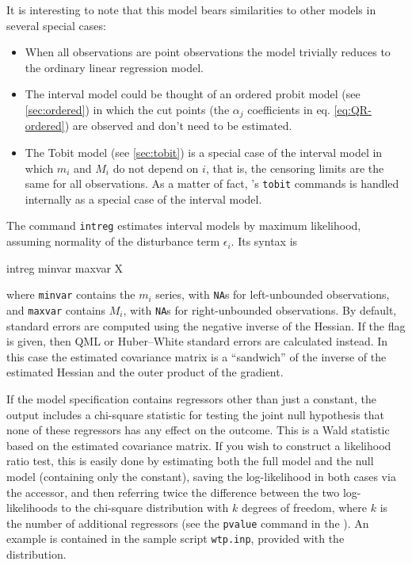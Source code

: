 It is interesting to note that this model bears similarities to other
models in several special cases:
\begin{itemize}
\item When all observations are point observations the model trivially
  reduces to the ordinary linear regression model.
\item The interval model could be thought of an ordered probit model
  (see \ref{sec:ordered}) in which the cut points (the $\alpha_j$
  coefficients in eq. \ref{eq:QR-ordered}) are observed and don't need
  to be estimated.
\item The Tobit model (see \ref{sec:tobit}) is a special case of the
  interval model in which $m_i$ and $M_i$ do not depend on $i$, that
  is, the censoring limits are the same for all observations. As a
  matter of fact, 's \texttt{tobit} commands is handled
  internally as a special case of the interval model.
\end{itemize}

The  command \texttt{intreg} estimates interval models by
maximum likelihood, assuming normality of the disturbance term
$\epsilon_i$.  Its syntax is
%
\begin{code}
intreg minvar maxvar X
\end{code}
%
where \texttt{minvar} contains the $m_i$ series, with \texttt{NA}s for
left-unbounded observations, and \texttt{maxvar} contains $M_i$, with
\texttt{NA}s for right-unbounded observations.  By default, standard
errors are computed using the negative inverse of the Hessian.  If the
 flag is given, then QML or Huber--White standard
errors are calculated instead. In this case the estimated covariance
matrix is a ``sandwich'' of the inverse of the estimated Hessian and
the outer product of the gradient.

If the model specification contains regressors other than just a
constant, the output includes a chi-square statistic for testing the
joint null hypothesis that none of these regressors has any effect on
the outcome.  This is a Wald statistic based on the estimated
covariance matrix.  If you wish to construct a likelihood ratio test,
this is easily done by estimating both the full model and the null
model (containing only the constant), saving the log-likelihood in
both cases via the  accessor, and then referring twice the
difference between the two log-likelihoods to the chi-square
distribution with $k$ degrees of freedom, where $k$ is the number of
additional regressors (see the \texttt{pvalue} command in the
\GCR). An example is contained in the sample script \texttt{wtp.inp},
provided with the  distribution.

